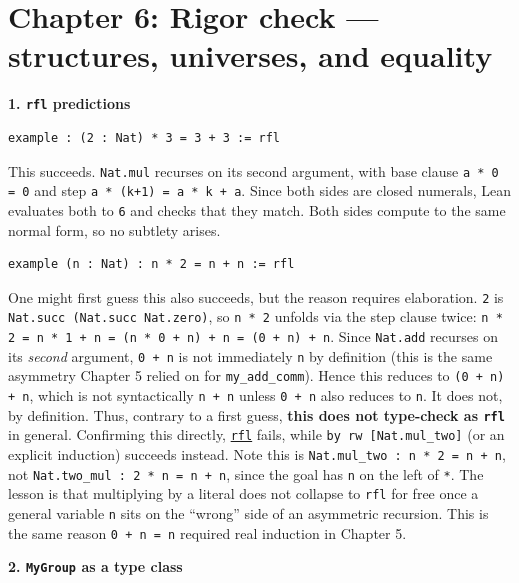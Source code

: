 \section{Chapter 6: Rigor check --- structures, universes, and equality}\label{sec:15-appendix-solutions:05-chapter-6:1}

\textbf{1. \texttt{rfl} predictions}

\begin{lstlisting}
example : (2 : Nat) * 3 = 3 + 3 := rfl
\end{lstlisting}

This succeeds. \texttt{Nat.mul} recurses on its second argument, with base clause \texttt{a * 0 = 0} and step \texttt{a * (k+1) = a * k + a}. Since both sides are closed numerals, Lean evaluates both to \texttt{6} and checks that they match. Both sides compute to the same normal form, so no subtlety arises.

\begin{lstlisting}
example (n : Nat) : n * 2 = n + n := rfl
\end{lstlisting}

One might first guess this also succeeds, but the reason requires elaboration. \texttt{2} is \texttt{Nat.succ (Nat.succ Nat.zero)}, so \texttt{n * 2} unfolds via the step clause twice: \texttt{n * 2 = n * 1 + n = (n * 0 + n) + n = (0 + n) + n}. Since \texttt{Nat.add} recurses on its \emph{second} argument, \texttt{0 + n} is not immediately \texttt{n} by definition (this is the same asymmetry Chapter 5 relied on for \texttt{my\_\allowbreak{}add\_\allowbreak{}comm}). Hence this reduces to \texttt{(0 + n) + n}, which is not syntactically \texttt{n + n} unless \texttt{0 + n} also reduces to \texttt{n}. It does not, by definition. Thus, contrary to a first guess, \textbf{this does not type-check as \texttt{rfl}} in general. Confirming this directly, \href{https://lean-lang.org/doc/reference/latest/Tactic-Proofs/Tactic-Reference/}{\texttt{rfl}} fails, while \texttt{by rw [Nat.mul\_\allowbreak{}two]} (or an explicit induction) succeeds instead. Note this is \texttt{Nat.mul\_\allowbreak{}two : n * 2 = n + n}, not \texttt{Nat.two\_\allowbreak{}mul : 2 * n = n + n}, since the goal has \texttt{n} on the left of \texttt{*}. The lesson is that multiplying by a literal does not collapse to \texttt{rfl} for free once a general variable \texttt{n} sits on the ``wrong'' side of an asymmetric recursion. This is the same reason \texttt{0 + n = n} required real induction in Chapter 5.

\textbf{2. \texttt{MyGroup} as a type class}

